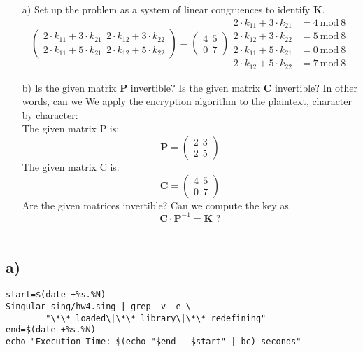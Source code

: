 \documentclass[11pt]{article}
\begin{document}
\begin{itemize}
\item[a)] Set up the problem as a system of linear congruences to identify $\mathbf{K}$.\\
\[
\left(\begin{matrix}
2\cdot k_{11}+3\cdot k_{21}\ \ 2\cdot k_{12}+3\cdot k_{22}\\
2\cdot k_{11}+5\cdot k_{21}\ \ 2\cdot k_{12}+5\cdot k_{22} 
\end{matrix}\right) = 
\left(\begin{matrix}
4\ \ 5\\
0\ \ 7 
\end{matrix}\right)

\begin{align*}
2\cdot k_{11}+3\cdot k_{21} &= 4\ \text{mod}\ 8\\
2\cdot k_{12}+3\cdot k_{22} &= 5\ \text{mod}\ 8\\
2\cdot k_{11}+5\cdot k_{21} &= 0\ \text{mod}\ 8\\
2\cdot k_{12}+5\cdot k_{22} &= 7\ \text{mod}\ 8
\end{align*}
\]

\item[b)]Is the given matrix $\mathbf{P}$ invertible? Is the given matrix $\mathbf{C}$ invertible? In other words, can we
We apply the encryption algorithm to the plaintext, character by character:\\
The given matrix P is: \\
\[
\mathbf{P} = 
\left(\begin{matrix}
2\ \ 3\\
2\ \ 5 
\end{matrix}\right)
\]
The given matrix C is: \\
\[
\mathbf{C} = 
\left(\begin{matrix}
4\ \ 5\\
0\ \ 7 
\end{matrix}\right)
\]
Are the given matrices invertible? Can we compute the key as
\[
\mathbf{C} \cdot \mathbf{P}^{-1} = \mathbf{K}\text{ ?}\] \\
\end{itemize}

\subsection{a)}
\label{sec:orge8764a5}
\begin{verbatim}
start=$(date +%s.%N)
Singular sing/hw4.sing | grep -v -e \
	    "\*\* loaded\|\*\* library\|\*\* redefining"
end=$(date +%s.%N)
echo "Execution Time: $(echo "$end - $start" | bc) seconds"
\end{verbatim}
\end{document}
